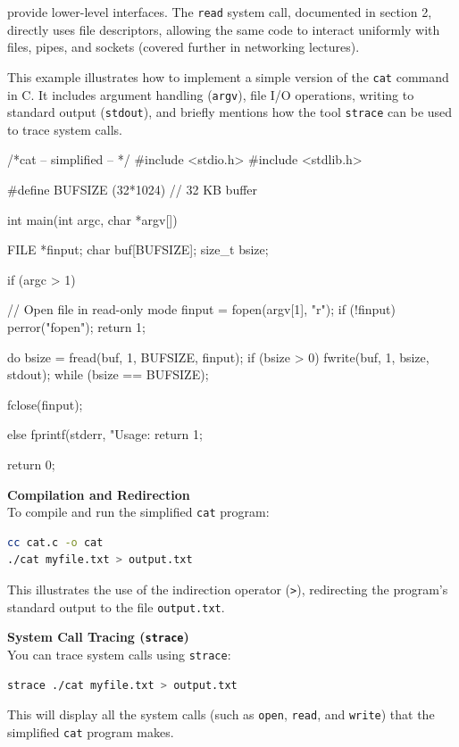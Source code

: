 provide lower-level interfaces. The \texttt{read} system call, documented in section 2, directly uses file descriptors, allowing the same code to interact uniformly with files, pipes, and sockets (covered further in networking lectures).\newpage
\begin{example}
\leavevmode
\upshape
This example illustrates how to implement a simple version of the \texttt{cat} command in C. It includes argument handling (\texttt{argv}), file I/O operations, writing to standard output (\texttt{stdout}), and briefly mentions how the tool \texttt{strace} can be used to trace system calls.

\begin{cc}
/*cat -- simplified -- */
#include <stdio.h>
#include <stdlib.h>

#define BUFSIZE (32*1024) // 32 KB buffer

int main(int argc, char *argv[]) {
    FILE *finput;
    char buf[BUFSIZE];
    size_t bsize;

    if (argc > 1) {
        // Open file in read-only mode
        finput = fopen(argv[1], "r");
        if (!finput) {
            perror("fopen");
            return 1;
        }

        do {
            bsize = fread(buf, 1, BUFSIZE, finput);
            if (bsize > 0)
                fwrite(buf, 1, bsize, stdout);
        } while (bsize == BUFSIZE);

        fclose(finput);
    } else {
        fprintf(stderr, "Usage: %
        return 1;
    }

    return 0;
}
\end{cc}
\textbf{Compilation and Redirection}\\
To compile and run the simplified \texttt{cat} program:

\begin{lstlisting}[language=bash]
cc cat.c -o cat
./cat myfile.txt > output.txt
\end{lstlisting}

This illustrates the use of the indirection operator (\texttt{>}), redirecting the program's standard output to the file \texttt{output.txt}.

\textbf{System Call Tracing (\texttt{strace})}\\
You can trace system calls using \texttt{strace}:
\begin{lstlisting}[language=bash]
strace ./cat myfile.txt > output.txt
\end{lstlisting}
This will display all the system calls (such as \texttt{open}, \texttt{read}, and \texttt{write}) that the simplified \texttt{cat} program makes.
\end{example}
\newpage
